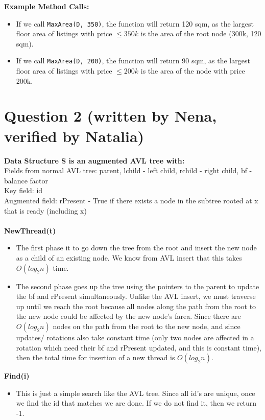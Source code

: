 \documentclass[11pt, a4paper]{article}
\begin{document}
\textbf{Example Method Calls:}
\begin{itemize}
    \item If we call \texttt{MaxArea(D, 350)}, the function will return 120 sqm, as the largest floor area of listings with price \( \leq 350k \) is the area of the root node (300k, 120 sqm).
    \item If we call \texttt{MaxArea(D, 200)}, the function will return 90 sqm, as the largest floor area of listings with price \( \leq 200k \) is the area of the node with price 200k.
\end{itemize}


\section*{Question 2 (written by Nena, verified by Natalia)}
\textbf{Data Structure S is an augmented AVL tree with:} \\
Fields from normal AVL tree: parent, lchild - left child, rchild - right child, bf - balance factor \\
Key field: id \\
Augmented field: rPresent - True if there exists a node in the subtree rooted at x that is ready (including x) \\\\
\textbf{NewThread(t)} \\
\begin{itemize}
    \item The first phase it to go down the tree from the root and insert the new node as a child of an existing node. We know from AVL insert that this takes $O(log_2n)$ time.
    \item The second phase goes up the tree using the pointers to the parent to update the bf and rPresent simultaneously. Unlike the AVL insert, we must traverse up until we reach the root because all nodes along the path from the root to the new node could be affected by the new node's farea. Since there are $O(log_2n)$ nodes on the path from the root to the new node, and since updates/ rotations also take constant time (only two nodes are affected in a rotation which need their bf and rPresent updated, and this is constant time), then the total time for insertion of a new thread is $O(log_2n)$.
\end{itemize}
\textbf{Find(i)} \\
\begin{itemize}
    \item This is just a simple search like the AVL tree. Since all id's are unique, once we find the id that matches we are done. If we do not find it, then we return -1.
\end{itemize}
\end{document}

